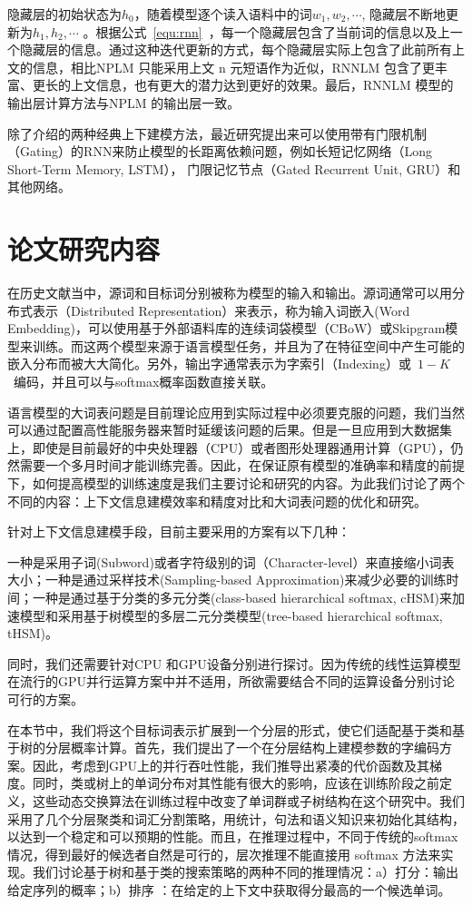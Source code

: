 隐藏层的初始状态为$h_0$，随着模型逐个读入语料中的词$w_1,w_2,\cdots$, 隐藏层不断地更新为$h_1,h_2,\cdots$ 。根据公式~\ref{equ:rnn}~，每一个隐藏层包含了当前词的信息以及上一个隐藏层的信息。通过这种迭代更新的方式，每个隐藏层实际上包含了此前所有上文的信息，相比NPLM 只能采用上文 n 元短语作为近似，RNNLM 包含了更丰富、更长的上文信息，也有更大的潜力达到更好的效果。最后，RNNLM 模型的输出层计算方法与NPLM 的输出层一致。


除了介绍的两种经典上下建模方法，最近研究提出来可以使用带有门限机制（Gating）的RNN来防止模型的长距离依赖问题，例如长短记忆网络（Long Short-Term Memory, LSTM）， 门限记忆节点（Gated Recurrent Unit, GRU）和其他网络。


\section{论文研究内容}
在历史文献当中，源词和目标词分别被称为模型的输入和输出。源词通常可以用分布式表示（Distributed Representation）来表示，称为输入词嵌入(Word Embedding)，可以使用基于外部语料库的连续词袋模型（CBoW）或Skipgram模型来训练。而这两个模型来源于语言模型任务，并且为了在特征空间中产生可能的嵌入分布而被大大简化。另外，输出字通常表示为字索引（Indexing）或~$1-K$~编码，并且可以与softmax概率函数直接关联。

语言模型的大词表问题是目前理论应用到实际过程中必须要克服的问题，我们当然可以通过配置高性能服务器来暂时延缓该问题的后果。但是一旦应用到大数据集上，即使是目前最好的中央处理器（CPU）或者图形处理器通用计算（GPU），仍然需要一个多月时间才能训练完善。因此，在保证原有模型的准确率和精度的前提下，如何提高模型的训练速度是我们主要讨论和研究的内容。为此我们讨论了两个不同的内容：上下文信息建模效率和精度对比和大词表问题的优化和研究。

针对上下文信息建模手段，目前主要采用的方案有以下几种：

一种是采用子词(Subword)或者字符级别的词（Character-level）来直接缩小词表大小；一种是通过采样技术(Sampling-based Approximation)来减少必要的训练时间；一种是通过基于分类的多元分类(class-based hierarchical softmax, cHSM)来加速模型和采用基于树模型的多层二元分类模型(tree-based hierarchical softmax, tHSM)。

同时，我们还需要针对CPU 和GPU设备分别进行探讨。因为传统的线性运算模型在流行的GPU并行运算方案中并不适用，所欲需要结合不同的运算设备分别讨论可行的方案。

在本节中，我们将这个目标词表示扩展到一个分层的形式，使它们适配基于类和基于树的分层概率计算。首先，我们提出了一个在分层结构上建模参数的字编码方案。因此，考虑到GPU上的并行吞吐性能，我们推导出紧凑的代价函数及其梯度。同时，类或树上的单词分布对其性能有很大的影响，应该在训练阶段之前定义，这些动态交换算法在训练过程中改变了单词群或子树结构在这个研究中。我们采用了几个分层聚类和词汇分割策略，用统计，句法和语义知识来初始化其结构，以达到一个稳定和可以预期的性能。而且，在推理过程中，不同于传统的softmax情况，得到最好的候选者自然是可行的，层次推理不能直接用 softmax 方法来实现。我们讨论基于树和基于类的搜索策略的两种不同的推理情况：a）打分：输出给定序列的概率；b）排序   ：在给定的上下文中获取得分最高的一个候选单词。
